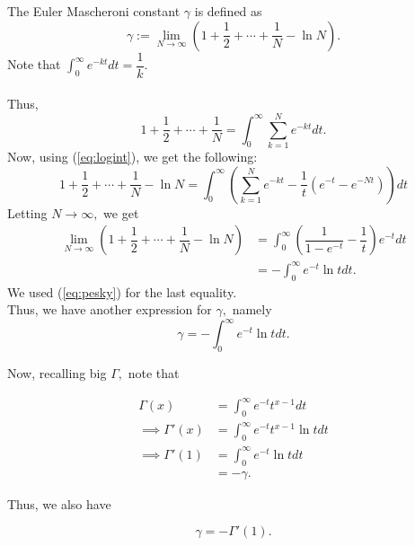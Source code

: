 \begin{mdframed}[style=boxstyle, frametitle={Smol gamma and big Gamma}]
	The Euler Mascheroni constant $\gamma$ is defined as
	\begin{equation*} 
		\gamma := \lim_{N\to \infty}\left(1 + \dfrac{1}{2} + \cdots + \dfrac{1}{N} - \ln N\right).
	\end{equation*}
	Note that $\displaystyle\int_{0}^{\infty} e^{-kt} dt = \dfrac{1}{k}.$\\~\\
	Thus,
	\begin{equation*}
		1 + \dfrac{1}{2} + \cdots + \dfrac{1}{N} = \int_{0}^{\infty} \sum_{k=1}^{N} e^{-kt} dt.
	\end{equation*}
	Now, using (\ref{eq:logint}), we get the following:
	\begin{equation*} 
		1 + \dfrac{1}{2} + \cdots + \dfrac{1}{N} - \ln N = \int_{0}^{\infty} \left(\sum_{k=1}^{N} e^{-kt} - \dfrac{1}{t}(e^{-t} - e^{-Nt})\right) dt
	\end{equation*}
	Letting $N \to \infty,$ we get
	\begin{align*} 
		\lim_{N\to \infty}\left(1 + \dfrac{1}{2} + \cdots + \dfrac{1}{N} - \ln N\right) &= \int_{0}^{\infty} \left(\dfrac{1}{1 - e^{-t}} - \dfrac{1}{t}\right)e^{-t} dt\\
		&= -\int_{0}^{\infty} e^{-t}\ln t dt.
	\end{align*}
	We used (\ref{eq:pesky}) for the last equality.\\
	Thus, we have another expression for $\gamma,$ namely
	\begin{equation*} 
		\boxed{\gamma = -\int_{0}^{\infty} e^{-t}\ln t dt.}
	\end{equation*}

	Now, recalling big $\Gamma,$ note that

	\begin{align*} 
		\Gamma(x) &= \int_{0}^{\infty} e^{-t}t^{x - 1} dt\\
		\implies \Gamma'(x) &= \int_{0}^{\infty} e^{-t}t^{x - 1}\ln t dt\\
		\implies \Gamma'(1) &= \int_{0}^{\infty} e^{-t}\ln t dt\\
		&= -\gamma.
	\end{align*}

	Thus, we also have

	\begin{equation*} 
		\boxed{\gamma = -\Gamma'(1).}
	\end{equation*}
\end{mdframed}